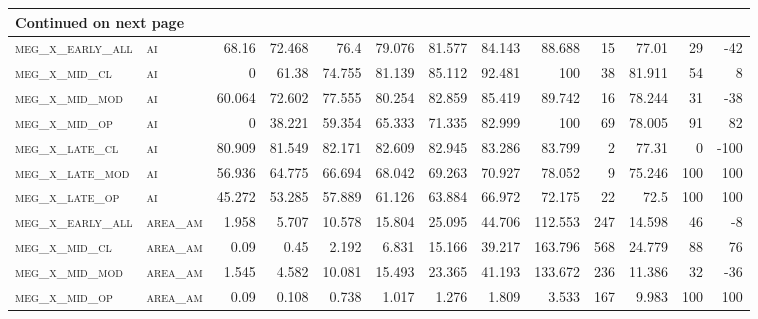\begin{landscape}
\begin{center}
\begin{footnotesize}
\begin{longtable}{llrrrrrrrr|rrr}
\hline \multicolumn{13}{|l|}{{Continued on next page}} \\ \hline
\endfoot

\hline \hline
\endlastfoot

\textsc{meg\_x\_early\_all} & \textsc{ai        }   & 68.16    & 72.468   & 76.4     & 79.076   & 81.577   & 84.143   & 88.688    & 15     & 77.01         & 29            & -42             \\
\textsc{meg\_x\_mid\_cl   } & \textsc{ai        }   & 0        & 61.38    & 74.755   & 81.139   & 85.112   & 92.481   & 100       & 38     & 81.911        & 54            & 8               \\
\textsc{meg\_x\_mid\_mod  } & \textsc{ai        }   & 60.064   & 72.602   & 77.555   & 80.254   & 82.859   & 85.419   & 89.742    & 16     & 78.244        & 31            & -38             \\
\textsc{meg\_x\_mid\_op   } & \textsc{ai        }   & 0        & 38.221   & 59.354   & 65.333   & 71.335   & 82.999   & 100       & 69     & 78.005        & 91            & 82              \\
\textsc{meg\_x\_late\_cl  } & \textsc{ai        }   & 80.909   & 81.549   & 82.171   & 82.609   & 82.945   & 83.286   & 83.799    & 2      & 77.31         & 0             & -100            \\
\textsc{meg\_x\_late\_mod } & \textsc{ai        }   & 56.936   & 64.775   & 66.694   & 68.042   & 69.263   & 70.927   & 78.052    & 9      & 75.246        & 100           & 100             \\
\textsc{meg\_x\_late\_op  } & \textsc{ai        }   & 45.272   & 53.285   & 57.889   & 61.126   & 63.884   & 66.972   & 72.175    & 22     & 72.5          & 100           & 100             \\
\textsc{meg\_x\_early\_all} & \textsc{area\_am  }   & 1.958    & 5.707    & 10.578   & 15.804   & 25.095   & 44.706   & 112.553   & 247    & 14.598        & 46            & -8              \\
\textsc{meg\_x\_mid\_cl   } & \textsc{area\_am  }   & 0.09     & 0.45     & 2.192    & 6.831    & 15.166   & 39.217   & 163.796   & 568    & 24.779        & 88            & 76              \\
\textsc{meg\_x\_mid\_mod  } & \textsc{area\_am  }   & 1.545    & 4.582    & 10.081   & 15.493   & 23.365   & 41.193   & 133.672   & 236    & 11.386        & 32            & -36             \\
\textsc{meg\_x\_mid\_op   } & \textsc{area\_am  }   & 0.09     & 0.108    & 0.738    & 1.017    & 1.276    & 1.809    & 3.533     & 167    & 9.983         & 100           & 100             \\

\end{longtable}
\end{footnotesize}
\end{center}
\end{landscape}
